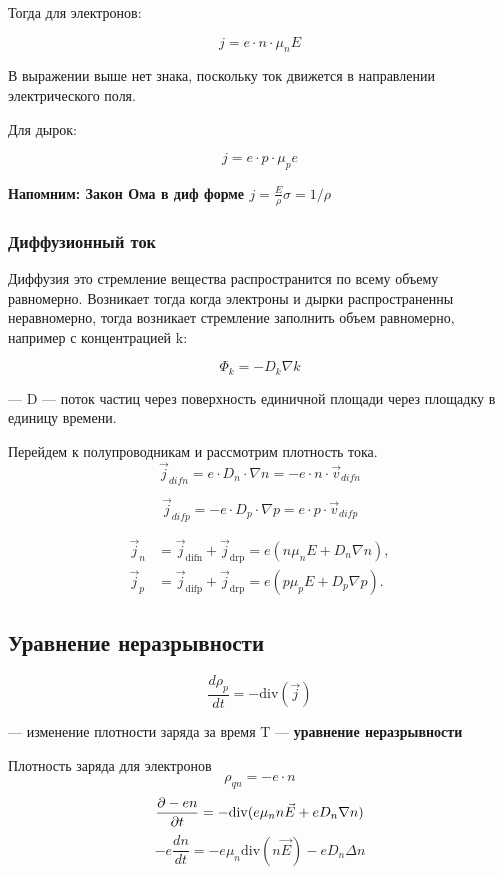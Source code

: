 \documentclass[../main.tex]{subfiles}
\begin{document}
Тогда для электронов:

\[j = e \cdot n \cdot \mu_n E\] 

В выражении выше нет знака, поскольку ток движется в направлении электрического поля.

Для дырок:

\[j = e \cdot p \cdot \mu_p e\]

\textbf{Напомним: Закон Ома в диф форме $j = \frac{E}{\rho} \sigma = 1/\rho$}

\subsubsection{Диффузионный ток}

Диффузия это стремление вещества распространится по всему объему равномерно. Возникает тогда когда электроны и дырки распространенны неравномерно,
тогда возникает стремление заполнить объем равномерно, например с концентрацией k:

\[\Phi_k = -D_k \nabla k\]
\begin{center}
    --- D --- поток частиц через поверхность единичной площади через площадку в единицу времени.    
\end{center}


Перейдем к полупроводникам и рассмотрим плотность тока.
\[\vec j_{difn} = e \cdot D_n \cdot \nabla n = -e \cdot n \cdot \vec v_{difn} \]

\[\vec j_{difp} = - e \cdot D_p \cdot \nabla p = e \cdot p \cdot \vec v_{difp}\]

\[
\boxed{
\begin{aligned}
\vec{j}_n &= \vec{j}_{\mathrm{difn}} + \vec{j}_{\mathrm{drp}} = e\!\left(n \mu_n E + D_n \nabla n\right),\\[6pt]
\vec{j}_p &= \vec{j}_{\mathrm{difp}} + \vec{j}_{\mathrm{drp}} = e\!\left(p \mu_p E + D_p \nabla p\right).
\end{aligned}
}
\]

\subsection{Уравнение неразрывности}
\[\frac{d \rho_p}{d t} = - \mathrm{div}( \vec j)\]
\begin{center}
    --- изменение плотности заряда за время T --- \textbf{уравнение неразрывности}
\end{center}

Плотность заряда для электронов
\[\rho_{qn} = - e \cdot n\]
\[\frac{\partial -en}{\partial t} = -\mathrm{div}(e \mu_n n \vec E + e D_n \nabla n)\]
\[-e \frac{d n}{d t} = -e \mu_n \mathrm{div}(n \vec E) - eD_n \Delta n\]
\end{document}
